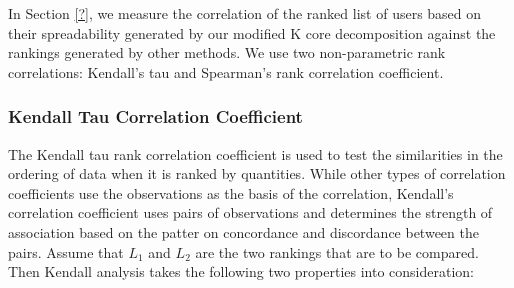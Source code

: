 \documentclass[sigconf]{acmart}
\begin{document}


In Section \ref{?}, we measure the correlation of the ranked list of users based on their spreadability generated by our modified K core decomposition against the rankings generated by other methods. We use two non-parametric rank correlations: Kendall’s tau and Spearman’s rank correlation coefficient.

\subsubsection{Kendall Tau Correlation Coefficient}

The Kendall tau rank correlation coefficient is used to test the similarities in the ordering of data when it is ranked by quantities. While other types of correlation coefficients use the observations as the basis of the correlation, Kendall’s correlation coefficient uses pairs of observations and determines the strength of association based on the patter on concordance and discordance between the pairs. Assume that $L_1$ and $L_2$ are the two rankings that are to be compared. Then Kendall analysis takes the following two properties into consideration:
\end{document}
